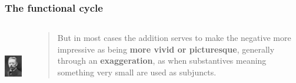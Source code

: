 \documentclass[compress]{beamer}
\begin{document}
\begin{frame}
\frametitle{The functional cycle}
\begin{columns}[T]  
   \begin{column}{.2\textwidth}
  	  \vspace{12pt}
	  \includegraphics[height=1.2in]{jespersen.jpg}   
   \end{column}
   \begin{column}{.75\textwidth}
      \begin{block}{}
      \begin{quote}
	But in most cases the addition serves to make the negative more impressive as being \textbf{more vivid or picturesque}, generally through an \textbf{exaggeration}, as when substantives meaning something very small are used as subjuncts.
      \end{quote}
	\end{block}
    \end{column}
  \end{columns}
 \vfill\hfill \citep{jespersen:1917}
\end{frame}
\end{document}
